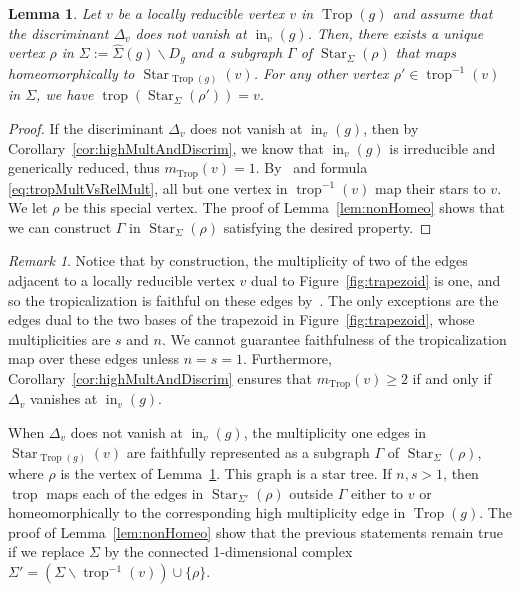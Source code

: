 \documentclass[11pt]{amsart}
\numberwithin{equation}{section}
\theoremstyle{plain}
\newtheorem{lemma}[theorem]{Lemma}
\theoremstyle{definition}
\theoremstyle{remark}
\newtheorem{remark}[theorem]{Remark}
\begin{document}
\begin{lemma}\label{lem:noDecontractionIfLocallySmooth}
  Let $v$ be a locally reducible vertex $v$
  in $\operatorname{Trop}(g)$ and assume that the discriminant $\Delta_v$ 
  does not vanish at $\operatorname{in}_v(g)$. Then, there exists a unique
  vertex $\rho$ in $\Sigma:=\widehat{\Sigma}(g)\smallsetminus D_g$ and a
  subgraph $\Gamma$ of $\operatorname{\ensuremath{Star}}_{\Sigma}(\rho)$ that maps
  homeomorphically to $\operatorname{\ensuremath{Star}}_{\operatorname{Trop}(g)}(v)$. For any other vertex
  $\rho'\in \operatorname{trop}^{-1}(v)$ in $\Sigma$, we have
  $\operatorname{trop}(\operatorname{\ensuremath{Star}}_{\Sigma}(\rho'))= v$.
\end{lemma}
\begin{proof}
  If the discriminant $\Delta_v$ does not vanish at $\operatorname{in}_v(g)$, then
  by Corollary~\ref{cor:highMultAndDiscrim}, we know that $\operatorname{in}_v(g)$
  is irreducible and generically reduced, thus
  $m_\operatorname{Trop}(v)=1$. By~\cite[Corollary 6.12]{BPR11} and formula \eqref{eq:tropMultVsRelMult}, all but one
  vertex in $\operatorname{trop}^{-1}(v)$ map their stars to $v$. We let  $\rho$ be this special
  vertex. The proof of Lemma~\ref{lem:nonHomeo} shows that we
  can construct $\Gamma$ in $\operatorname{\ensuremath{Star}}_{\Sigma}(\rho)$ satisfying
  the desired property.
\end{proof}
\begin{remark}\label{rem:LocalFaithfulnessAroundV}
  Notice that by construction, the multiplicity of two of the edges
  adjacent to a locally reducible vertex $v$ dual to
  Figure~\ref{fig:trapezoid} is one, and so the tropicalization is
  faithful on these edges by~\cite[Theorem 6.23]{BPR11}.  The only
  exceptions are the edges dual to the two bases of the trapezoid in
  Figure~\ref{fig:trapezoid}, whose multiplicities are $s$ and $n$.
  We cannot guarantee faithfulness of the tropicalization map over
  these edges unless $n=s=1$. Furthermore,
  Corollary~\ref{cor:highMultAndDiscrim} ensures that
  $m_\operatorname{Trop}(v)\geq 2$ if and only if $\Delta_{v}$ vanishes at
  $\operatorname{in}_v(g)$.

  When $\Delta_v$ does not vanish at $\operatorname{in}_v(g)$, the multiplicity
  one edges in $\operatorname{\ensuremath{Star}}_{\operatorname{Trop}(g)}(v)$ are faithfully represented as a
  subgraph $\Gamma$ of $\operatorname{\ensuremath{Star}}_{\Sigma}(\rho)$, where $\rho$ is the
  vertex of Lemma~\ref{lem:noDecontractionIfLocallySmooth}. This graph
  is a star tree.  If $n,s>1$, then $\operatorname{trop}$ maps each of the edges in
  $\operatorname{\ensuremath{Star}}_{\Sigma'}(\rho)$ outside $\Gamma$ either to $v$ or
  homeomorphically to the corresponding high multiplicity edge in
  $\operatorname{Trop}(g)$. The proof of Lemma~\ref{lem:nonHomeo} show that the
  previous statements remain true if we replace $\Sigma$ by the
  connected 1-dimensional complex $\Sigma'=(\Sigma\smallsetminus
  \operatorname{trop}^{-1}(v)) \cup \{\rho\}$.
\end{remark}
\end{document}
